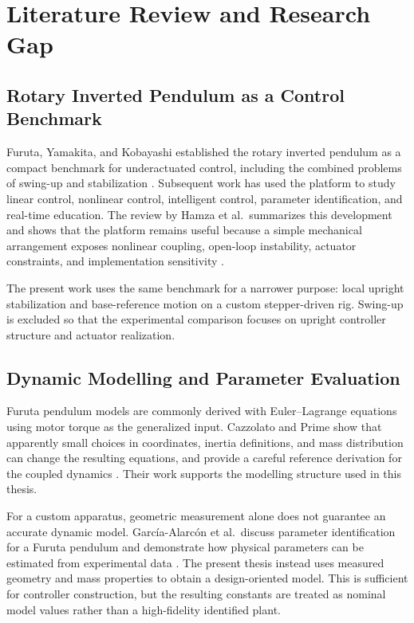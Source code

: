 \chapter{Literature Review and Research Gap}
\label{ch:literature}

\section{Rotary Inverted Pendulum as a Control Benchmark}
Furuta, Yamakita, and Kobayashi established the rotary inverted pendulum as a
compact benchmark for underactuated control, including the combined problems
of swing-up and stabilization \cite{Furuta1991}. Subsequent work has used the
platform to study linear control, nonlinear control, intelligent control,
parameter identification, and real-time education. The review by Hamza
et al.\ summarizes this development and shows that the platform remains useful
because a simple mechanical arrangement exposes nonlinear coupling,
open-loop instability, actuator constraints, and implementation sensitivity
\cite{Hamza2019}.

The present work uses the same benchmark for a narrower purpose: local
upright stabilization and base-reference motion on a custom stepper-driven
rig. Swing-up is excluded so that the experimental comparison focuses on
upright controller structure and actuator realization.

\section{Dynamic Modelling and Parameter Evaluation}
Furuta pendulum models are commonly derived with Euler--Lagrange equations
using motor torque as the generalized input. Cazzolato and Prime show that
apparently small choices in coordinates, inertia definitions, and mass
distribution can change the resulting equations, and provide a careful
reference derivation for the coupled dynamics \cite{Cazzolato2011}. Their work
supports the modelling structure used in this thesis.

For a custom apparatus, geometric measurement alone does not guarantee an
accurate dynamic model. Garc\'ia-Alarc\'on et al.\ discuss parameter
identification for a Furuta pendulum and demonstrate how physical parameters
can be estimated from experimental data \cite{GarciaAlarcon2012}. The present
thesis instead uses measured geometry and mass properties to obtain a
design-oriented model. This is sufficient for controller construction, but the
resulting constants are treated as nominal model values rather than a
high-fidelity identified plant.

